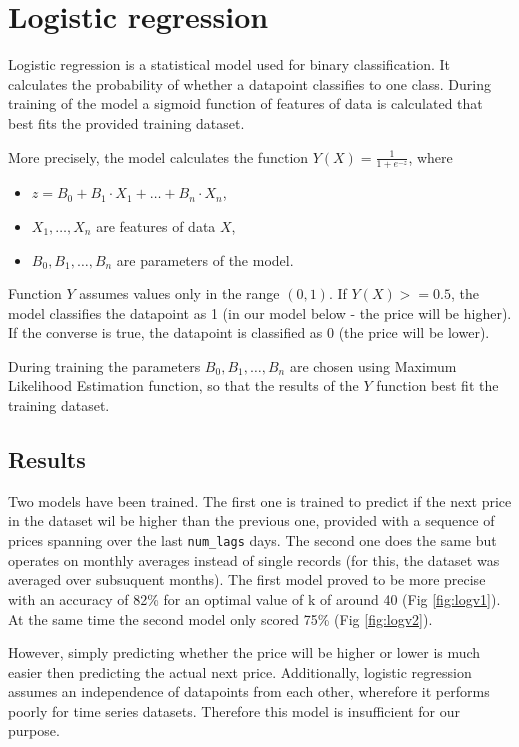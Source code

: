 \section{Logistic regression}

Logistic regression is a statistical model used for binary classification.
It calculates the probability of whether a datapoint classifies to one class.
During training of the model a sigmoid function of features of data is calculated that best fits the provided training dataset.

More precisely, the model calculates the function \(Y(X) = \frac{1}{1+e^{-z}}\), where
\begin{itemize}
	\item \(z = B_0 + B_1\cdot X_1 + \ldots + B_n\cdot X_n\),
	\item \(X_1, \ldots, X_n\) are features of data \(X\),
	\item \(B_0, B_1, \ldots, B_n\) are parameters of the model.
\end{itemize}
Function \(Y\) assumes values only in the range \((0,1)\).
If \(Y(X) >= 0.5\), the model classifies the datapoint as 1 (in our model below - the price will be higher). If the converse is true, the datapoint is classified as 0 (the price will be lower).

During training the parameters \(B_0, B_1, \ldots, B_n\) are chosen using Maximum Likelihood Estimation function, so that the results of the \(Y\) function best fit the training dataset.

\subsection{Results}
Two models have been trained.
The first one is trained to predict if the next price in the dataset wil be higher than the previous one, provided with a sequence of prices spanning over the last \verb|num_lags| days.
The second one does the same but operates on monthly averages instead of single records (for this, the dataset was averaged over subsuquent months).
The first model proved to be more precise with an accuracy of 82\% for an optimal value of k of around 40 (Fig \ref{fig:logv1}). At the same time the second model only scored 75\% (Fig \ref{fig:logv2}).

However, simply predicting whether the price will be higher or lower is much easier then predicting the actual next price.
Additionally, logistic regression assumes an independence of datapoints from each other, wherefore it performs poorly for time series datasets.
Therefore this model is insufficient for our purpose.

